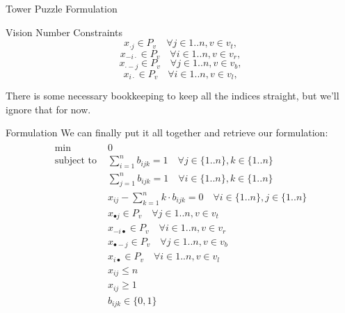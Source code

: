 \documentclass[12pt]{article}
\begin{document}
\begin{section}{Tower Puzzle Formulation}
\begin{subsection}{Vision Number Constraints}
\[x_{\cdot j}\in P_v \quad \forall j\in{1..n},v\in v_t,\]
\[x_{-i\cdot}\in P_v \quad \forall i\in{1..n},v\in v_r,\]
\[x_{\cdot -j}\in P_v \quad \forall j\in{1..n},v\in v_b,\]
\[x_{i\cdot}\in P_v \quad \forall i\in{1..n},v\in v_l,\]

There is some necessary bookkeeping to keep all the indices straight, but we'll ignore that for now.
\end{subsection}
\begin{subsection}{Formulation}
We can finally put it all together and retrieve our formulation:
\begin{align*}
    \begin{split}
        \mbox{min }&0 \\
        \mbox{subject to }&\sum_{i=1}^{n}b_{ijk} = 1 \quad \forall j\in\{1..n\},k\in\{1..n\} \\
        &\sum_{j=1}^{n}b_{ijk} = 1 \quad \forall i\in\{1..n\},k\in\{1..n\} \\
        &x_{ij} - \sum_{k=1}^nk\cdot b_{ijk} = 0 \quad \forall i\in\{1..n\},j\in\{1..n\} \\
        &x_{\bullet j}\in P_v \quad \forall j\in{1..n},v\in v_t \\
        &x_{-i\bullet}\in P_v \quad \forall i\in{1..n},v\in v_r \\
        &x_{\bullet -j}\in P_v \quad \forall j\in{1..n},v\in v_b \\
        &x_{i\bullet}\in P_v \quad \forall i\in{1..n},v\in v_l \\
        &x_{ij}\leq n \\
        &x_{ij}\geq 1 \\
        &b_{ijk}\in \{0,1\} \\
    \end{split}
\end{align*}
\end{subsection}
\end{section}
\end{document}
